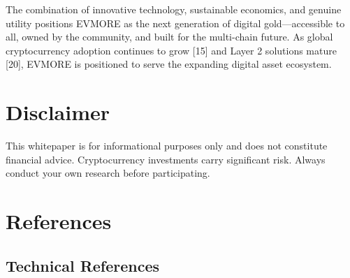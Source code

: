 \documentclass[11pt,a4paper]{article}
\begin{document}
The combination of innovative technology, sustainable economics, and genuine utility positions EVMORE as the next generation of digital gold---accessible to all, owned by the community, and built for the multi-chain future. As global cryptocurrency adoption continues to grow [15] and Layer 2 solutions mature [20], EVMORE is positioned to serve the expanding digital asset ecosystem.

\section*{Disclaimer}

This whitepaper is for informational purposes only and does not constitute financial advice. Cryptocurrency investments carry significant risk. Always conduct your own research before participating.

\section*{References}

\subsection*{Technical References}
\end{document}

